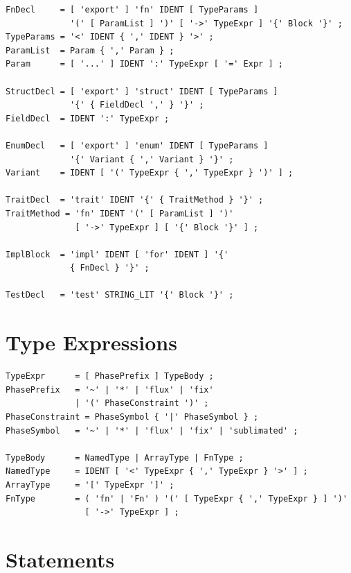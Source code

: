\begin{lstlisting}[style=ebnf]
FnDecl     = [ 'export' ] 'fn' IDENT [ TypeParams ]
             '(' [ ParamList ] ')' [ '->' TypeExpr ] '{' Block '}' ;
TypeParams = '<' IDENT { ',' IDENT } '>' ;
ParamList  = Param { ',' Param } ;
Param      = [ '...' ] IDENT ':' TypeExpr [ '=' Expr ] ;

StructDecl = [ 'export' ] 'struct' IDENT [ TypeParams ]
             '{' { FieldDecl ',' } '}' ;
FieldDecl  = IDENT ':' TypeExpr ;

EnumDecl   = [ 'export' ] 'enum' IDENT [ TypeParams ]
             '{' Variant { ',' Variant } '}' ;
Variant    = IDENT [ '(' TypeExpr { ',' TypeExpr } ')' ] ;

TraitDecl  = 'trait' IDENT '{' { TraitMethod } '}' ;
TraitMethod = 'fn' IDENT '(' [ ParamList ] ')'
              [ '->' TypeExpr ] [ '{' Block '}' ] ;

ImplBlock  = 'impl' IDENT [ 'for' IDENT ] '{'
             { FnDecl } '}' ;

TestDecl   = 'test' STRING_LIT '{' Block '}' ;
\end{lstlisting}


\section{Type Expressions}

\begin{lstlisting}[style=ebnf]
TypeExpr      = [ PhasePrefix ] TypeBody ;
PhasePrefix   = '~' | '*' | 'flux' | 'fix'
              | '(' PhaseConstraint ')' ;
PhaseConstraint = PhaseSymbol { '|' PhaseSymbol } ;
PhaseSymbol   = '~' | '*' | 'flux' | 'fix' | 'sublimated' ;

TypeBody      = NamedType | ArrayType | FnType ;
NamedType     = IDENT [ '<' TypeExpr { ',' TypeExpr } '>' ] ;
ArrayType     = '[' TypeExpr ']' ;
FnType        = ( 'fn' | 'Fn' ) '(' [ TypeExpr { ',' TypeExpr } ] ')'
                [ '->' TypeExpr ] ;
\end{lstlisting}


\section{Statements}

